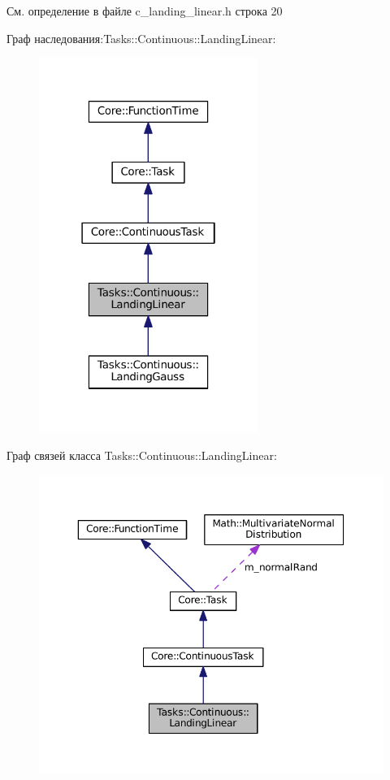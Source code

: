 См. определение в файле c\+\_\+landing\+\_\+linear.\+h строка 20



Граф наследования\+:Tasks\+:\+:Continuous\+:\+:Landing\+Linear\+:
\nopagebreak
\begin{figure}[H]
\begin{center}
\leavevmode
\includegraphics[width=202pt]{class_tasks_1_1_continuous_1_1_landing_linear__inherit__graph}
\end{center}
\end{figure}


Граф связей класса Tasks\+:\+:Continuous\+:\+:Landing\+Linear\+:
\nopagebreak
\begin{figure}[H]
\begin{center}
\leavevmode
\includegraphics[width=350pt]{class_tasks_1_1_continuous_1_1_landing_linear__coll__graph}
\end{center}
\end{figure}


